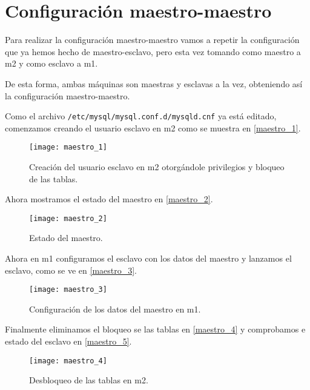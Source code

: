\chapter{Configuración maestro-maestro}

Para realizar la configuración maestro-maestro vamos a repetir la configuración que ya hemos hecho de maestro-esclavo, pero esta vez tomando como maestro a m2 y como esclavo a m1.

De esta forma, ambas máquinas son maestras y esclavas a la vez, obteniendo así la configuración maestro-maestro.

Como el archivo \verb|/etc/mysql/mysql.conf.d/mysqld.cnf| ya está editado, comenzamos creando el usuario esclavo en m2 como se muestra en \eqref{maestro_1}.

\begin{figure}[h!]
\begin{center}
\caption{Creación del usuario esclavo en m2 otorgándole privilegios y bloqueo de las tablas.}
\label{maestro_1}
\texttt{[image: maestro\_1]}
\end{center}
\end{figure}

Ahora mostramos el estado del maestro en \eqref{maestro_2}.

\begin{figure}[h!]
\begin{center}
\caption{Estado del maestro.}
\label{maestro_2}
\texttt{[image: maestro\_2]}
\end{center}
\end{figure}

Ahora en m1 configuramos el esclavo con los datos del maestro y lanzamos el esclavo, como se ve en \eqref{maestro_3}.

\begin{figure}[h!]
\begin{center}
\caption{Configuración de los datos del maestro en m1.}
\label{maestro_3}
\texttt{[image: maestro\_3]}
\end{center}
\end{figure}

Finalmente eliminamos el bloqueo se las tablas en \eqref{maestro_4} y comprobamos e estado del esclavo en \eqref{maestro_5}.

\begin{figure}[h!]
\begin{center}
\caption{Desbloqueo de las tablas en m2.}
\label{maestro_4}
\texttt{[image: maestro\_4]}
\end{center}
\end{figure}

